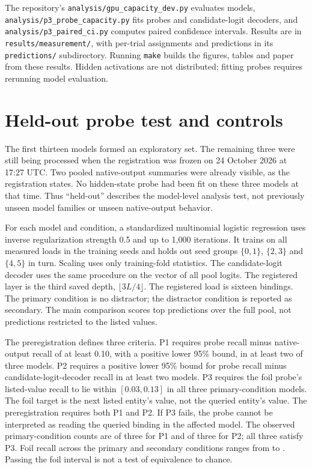 \documentclass{article}
\begin{document}
The repository's \texttt{analysis/gpu\_capacity\_dev.py} evaluates models, \texttt{analysis/p3\_probe\_capacity.py} fits probes and candidate-logit decoders, and \texttt{analysis/p3\_paired\_ci.py} computes paired confidence intervals.
Results are in \texttt{results/measurement/}, with per-trial assignments and predictions in its \texttt{predictions/} subdirectory.
Running \texttt{make} builds the figures, tables and paper from these results.
Hidden activations are not distributed; fitting probes requires rerunning model evaluation.

\section{Held-out probe test and controls}\label{app:heldout}
The first thirteen models formed an exploratory set.
The remaining three were still being processed when the registration was frozen on 24 October 2026 at 17:27 UTC.
Two pooled native-output summaries were already visible, as the registration states.
No hidden-state probe had been fit on these three models at that time.
Thus ``held-out'' describes the model-level analysis test, not previously unseen model families or unseen native-output behavior.

For each model and condition, a standardized multinomial logistic regression uses inverse regularization strength 0.5 and up to 1{,}000 iterations.
It trains on all measured loads in the training seeds and holds out seed groups $\{0,1\}$, $\{2,3\}$ and $\{4,5\}$ in turn.
Scaling uses only training-fold statistics.
The candidate-logit decoder uses the same procedure on the vector of all pool logits.
The registered layer is the third saved depth, $\lfloor3L/4\rfloor$.
The registered load is sixteen bindings.
The primary condition is no distractor; the distractor condition is reported as secondary.
The main comparison scores top predictions over the full pool, not predictions restricted to the listed values.

The preregistration defines three criteria.
P1 requires probe recall minus native-output recall of at least 0.10, with a positive lower 95\% bound, in at least two of three models.
P2 requires a positive lower 95\% bound for probe recall minus candidate-logit-decoder recall in at least two models.
P3 requires the foil probe's listed-value recall to lie within $[0.03,0.13]$ in all three primary-condition models.
The foil target is the next listed entity's value, not the queried entity's value.
The preregistration requires both P1 and P2.
If P3 fails, the probe cannot be interpreted as reading the queried binding in the affected model.
The observed primary-condition counts are \NewHeldPone{} of three for P1 and \NewHeldPtwo{} of three for P2; all three satisfy P3.
Foil recall across the primary and secondary conditions ranges from \NewFoilLo{} to \NewFoilHi{}.
Passing the foil interval is not a test of equivalence to chance.
\end{document}
